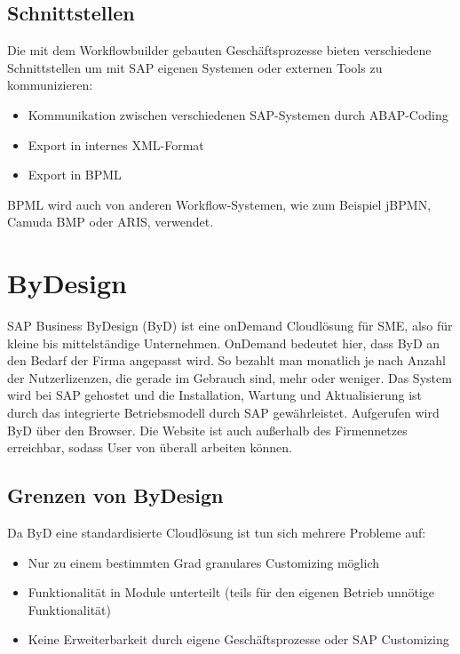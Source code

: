 \documentclass{handout}
\begin{document}
\newpage

\subsection{Schnittstellen}

Die mit dem Workflowbuilder gebauten Geschäftsprozesse bieten verschiedene Schnittstellen um mit SAP eigenen Systemen oder externen Tools zu kommunizieren:

\begin{itemize}
\item Kommunikation zwischen verschiedenen SAP-Systemen durch ABAP-Coding
\item Export in internes XML-Format
\item Export in BPML
\end{itemize}

BPML wird auch von anderen Workflow-Systemen, wie zum Beispiel jBPMN, Camuda BMP oder ARIS, verwendet.

\section{ByDesign}

SAP Business ByDesign (ByD) ist eine onDemand Cloudlösung für SME, also für kleine bis mittelständige Unternehmen. OnDemand bedeutet hier, dass ByD an den Bedarf der Firma angepasst wird. So bezahlt man monatlich je nach Anzahl der Nutzerlizenzen, die gerade im Gebrauch sind, mehr oder weniger. Das System wird bei SAP gehostet und die Installation, Wartung und Aktualisierung ist durch das integrierte Betriebsmodell durch SAP gewährleistet. Aufgerufen wird ByD über den Browser. Die Website ist auch außerhalb des Firmennetzes erreichbar, sodass User von überall arbeiten können.

\subsection{Grenzen von ByDesign}

Da ByD eine standardisierte Cloudlösung ist tun sich mehrere Probleme auf:

\begin{itemize}
\item Nur zu einem bestimmten Grad granulares Customizing möglich
\item Funktionalität in Module unterteilt (teils für den eigenen Betrieb unnötige Funktionalität)
\item Keine Erweiterbarkeit durch eigene Geschäftsprozesse oder SAP Customizing
\end{itemize}
\end{document}
